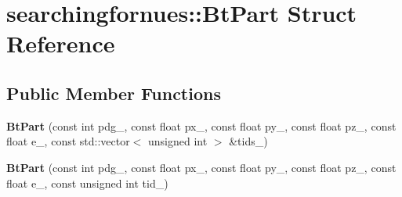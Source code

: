 \hypertarget{structsearchingfornues_1_1BtPart}{\section{searchingfornues\-:\-:Bt\-Part Struct Reference}
\label{structsearchingfornues_1_1BtPart}
}
\subsection*{Public Member Functions}
\begin{DoxyCompactItemize}
\item 
\hypertarget{structsearchingfornues_1_1BtPart_a00003f0908892d8a64f80a8b3f2e6f90}{{\bfseries Bt\-Part} (const int pdg\-\_\-, const float px\-\_\-, const float py\-\_\-, const float pz\-\_\-, const float e\-\_\-, const std\-::vector$<$ unsigned int $>$ \&tids\-\_\-)}\label{structsearchingfornues_1_1BtPart_a00003f0908892d8a64f80a8b3f2e6f90}

\item 
\hypertarget{structsearchingfornues_1_1BtPart_a69048423846c19666791da82138ce613}{{\bfseries Bt\-Part} (const int pdg\-\_\-, const float px\-\_\-, const float py\-\_\-, const float pz\-\_\-, const float e\-\_\-, const unsigned int tid\-\_\-)}\label{structsearchingfornues_1_1BtPart_a69048423846c19666791da82138ce613}

\end{DoxyCompactItemize}
